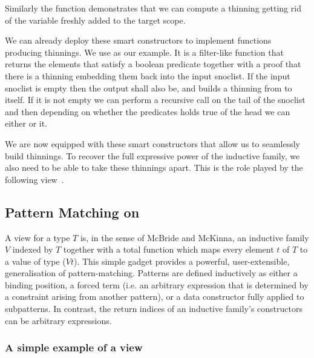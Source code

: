 
Similarly the  function demonstrates that we can compute a
thinning getting rid of the variable  freshly added to the target
scope.


We can already deploy these smart constructors to implement functions producing
thinnings. We use  as our example. It is a filter-like
function that returns the elements that satisfy a boolean predicate together with
a proof that there is a thinning embedding them back into the input snoclist.
%
If the input snoclist is empty then the output shall also be, and
 builds a thinning from \IdrisData{[<]} to itself.
%
If it is not empty we can perform a recursive call on the tail of the snoclist
and then depending on whether the predicates holds true of the head we can either
 or  it.


We are now equipped with these smart constructors that allow us to seamlessly
build thinnings.
%
To recover the full expressive power of the inductive family, we also need to
be able to take these thinnings apart. This is the role played by the following
view~\cite{DBLP:journals/jfp/McBrideM04}.

\subsection{Pattern Matching on }

A view for a type $T$ is, in the sense of McBride and McKinna, an inductive family
$V$ indexed by $T$ together with a total function which maps every element $t$ of $T$
to a value of type ($V t$).
%
This simple gadget provides a powerful, user-extensible, generalisation of
pattern-matching.
%
Patterns are defined inductively as either a binding position, a forced term
(i.e. an arbitrary expression that is determined by a constraint arising from
another pattern), or a data constructor fully applied to subpatterns.
%
In contrast, the return indices of an inductive family's constructors can be
arbitrary expressions.

\subsubsection{A simple example of a view}

